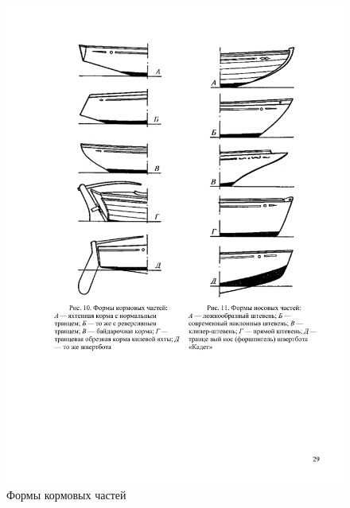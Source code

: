 \documentclass[a4paper, 12pt, twoside, final]{scrbook}
\begin{document}
\begin{figure}[htbp]
	\begin{minipage}[b]{0.49\textwidth}
		\centering\includegraphics{pics/Formy_korma}
		\caption{Формы кормовых частей}
		\label{fig:10}
	\end{minipage}
	\hfil\hfil%
	\begin{minipage}[b]{0.49\textwidth}

\end{minipage}
\end{figure}
\end{document}
